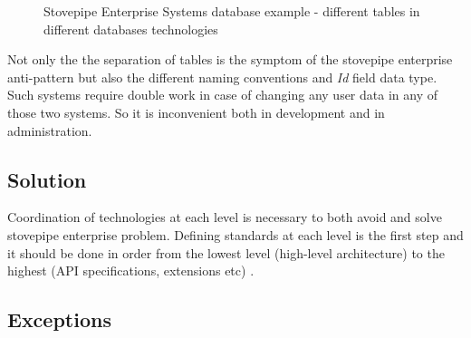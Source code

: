 \begin{figure}[htp]
\hfill%
%
\caption[Stovepipe Enterprise Systems database example]{Stovepipe Enterprise Systems database example - different tables in different databases technologies}
\label{fig:DatabaseExample}
\end{figure}

Not only the the separation of tables is the symptom of the stovepipe enterprise anti-pattern but also the different naming conventions and \emph{Id} field data type.
Such systems require double work in case of changing any user data in any of those two systems. So it is inconvenient both in development and in administration.

\subsection{Solution}

Coordination of technologies at each level is necessary to both avoid and solve stovepipe enterprise problem. Defining standards at each level is the first step and it should be done in order from the lowest level (high-level architecture) to the highest (API specifications, extensions etc) \cite{SurvivalGuide}.


\subsection{Exceptions}
